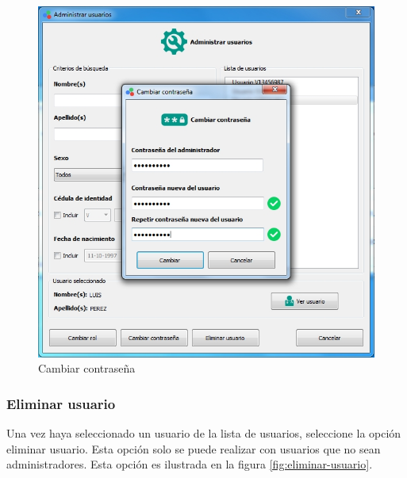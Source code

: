 \begin{figure}[H]
  \centering
  \includegraphics[width=1\linewidth]{./img/administrar-clave.jpg}
\caption[]{Cambiar contrase\~{n}a\label{fig:cambiar-clave2}}
\end{figure}
\newpage
		\subsubsection*{Eliminar usuario}
		
		Una vez haya seleccionado un usuario de la lista de usuarios, seleccione la opci\'{o}n eliminar usuario. Esta opci\'{o}n solo se puede realizar con usuarios que no sean administradores. Esta opci\'{o}n es ilustrada en la figura \ref{fig:eliminar-usuario}.
		
